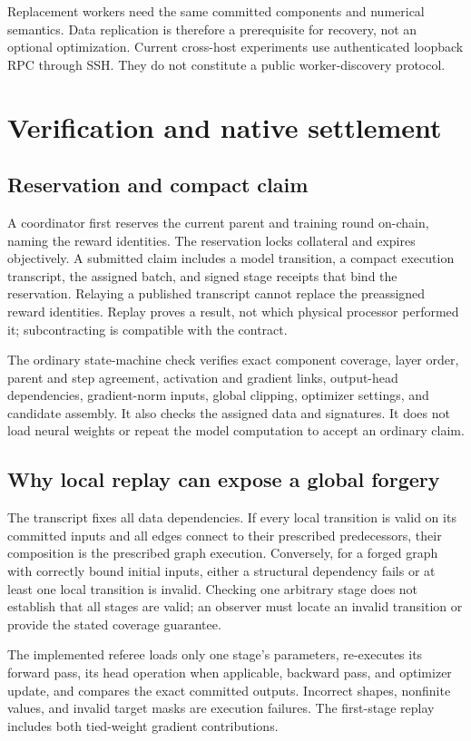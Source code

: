 \documentclass[11pt]{article}
\begin{document}
Replacement workers need the same committed components and numerical semantics. Data replication is therefore a prerequisite for recovery, not an optional optimization. Current cross-host experiments use authenticated loopback RPC through SSH. They do not constitute a public worker-discovery protocol.

\section{Verification and native settlement}
\subsection{Reservation and compact claim}
A coordinator first reserves the current parent and training round on-chain, naming the reward identities. The reservation locks collateral and expires objectively. A submitted claim includes a model transition, a compact execution transcript, the assigned batch, and signed stage receipts that bind the reservation. Relaying a published transcript cannot replace the preassigned reward identities. Replay proves a result, not which physical processor performed it; subcontracting is compatible with the contract.

The ordinary state-machine check verifies exact component coverage, layer order, parent and step agreement, activation and gradient links, output-head dependencies, gradient-norm inputs, global clipping, optimizer settings, and candidate assembly. It also checks the assigned data and signatures. It does not load neural weights or repeat the model computation to accept an ordinary claim.

\subsection{Why local replay can expose a global forgery}
The transcript fixes all data dependencies. If every local transition is valid on its committed inputs and all edges connect to their prescribed predecessors, their composition is the prescribed graph execution. Conversely, for a forged graph with correctly bound initial inputs, either a structural dependency fails or at least one local transition is invalid. Checking one arbitrary stage does not establish that all stages are valid; an observer must locate an invalid transition or provide the stated coverage guarantee.

The implemented referee loads only one stage's parameters, re-executes its forward pass, its head operation when applicable, backward pass, and optimizer update, and compares the exact committed outputs. Incorrect shapes, nonfinite values, and invalid target masks are execution failures. The first-stage replay includes both tied-weight gradient contributions.
\end{document}
